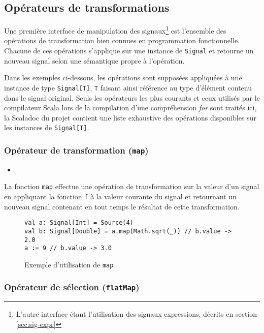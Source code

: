 \subsection{Opérateurs de transformations}

Une première interface de manipulation des signaux\footnote{L'autre interface étant l'utilisation des signaux expressions, décrits en section \ref{sec:sig-expr}} est l'ensemble des opérations de transformation bien connues en programmation fonctionnelle. Chacune de ces opérations s'applique sur une instance de \texttt{Signal} et retourne un nouveau signal selon une sémantique propre à l'opération.

Dans les exemples ci-dessous, les opérations sont supposées appliquées à une instance de type \texttt{Signal[T]}, \texttt{T} faisant ainsi référence au type d'élément contenu dans le signal original. Seuls les opérateurs les plus courants et ceux utilisés par le compilateur Scala lors de la compilation d'une compréhension \emph{for} sont traités ici, la Scaladoc du projet contient une liste exhaustive des opérations disponibles sur les instances de \texttt{Signal[T]}.

\subsubsection{Opérateur de transformation (\texttt{map})}

\begin{itemize}
	\item {}
\end{itemize}

La fonction \texttt{map} effectue une opération de transformation sur la valeur d'un signal en appliquant la fonction \texttt{f} à la valeur courante du signal et retournant un nouveau signal contenant en tout temps le résultat de cette transformation.

\begin{figure}[h]
	\begin{lstlisting}
val a: Signal[Int] = Source(4)
val b: Signal[Double] = a.map(Math.sqrt(_)) // b.value -> 2.0
a := 9 // b.value -> 3.0
	\end{lstlisting}
	\caption{Exemple d'utilisation de \texttt{map}}
\end{figure}

\subsubsection{Opérateur de sélection (\texttt{flatMap})}
	
